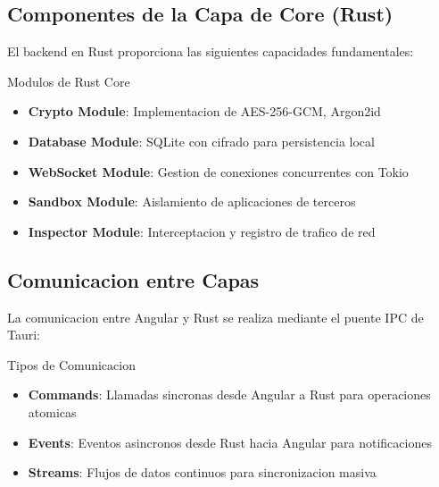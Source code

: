 
\subsection{Componentes de la Capa de Core (Rust)}

El backend en Rust proporciona las siguientes capacidades fundamentales:

\begin{caja}{Modulos de Rust Core}
\begin{itemize}
\item \textbf{Crypto Module}: Implementacion de AES-256-GCM, Argon2id
\item \textbf{Database Module}: SQLite con cifrado para persistencia local
\item \textbf{WebSocket Module}: Gestion de conexiones concurrentes con Tokio
\item \textbf{Sandbox Module}: Aislamiento de aplicaciones de terceros
\item \textbf{Inspector Module}: Interceptacion y registro de trafico de red
\end{itemize}
\end{caja}


\subsection{Comunicacion entre Capas}

La comunicacion entre Angular y Rust se realiza mediante el puente IPC de Tauri:

\begin{caja}{Tipos de Comunicacion}
\begin{itemize}
\item \textbf{Commands}: Llamadas sincronas desde Angular a Rust para operaciones atomicas
\item \textbf{Events}: Eventos asincronos desde Rust hacia Angular para notificaciones
\item \textbf{Streams}: Flujos de datos continuos para sincronizacion masiva
\end{itemize}
\end{caja}

